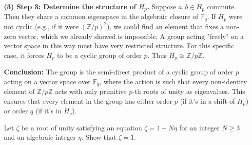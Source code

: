 \begin{solution}
\textbf{(3) Step 3: Determine the structure of $H_p$.}
Suppose $a, b \in H_p$ commute. Then they share a common eigenspace in the algebraic closure of $\mathbb{F}_q$.
If $H_p$ were not cyclic (e.g., if it were $(\mathbb{Z}/p)^2$), we could find an element that fixes a non-zero vector, which we already showed is impossible.
A group acting "freely" on a vector space in this way must have very restricted structure. For this specific case, it forces $H_p$ to be a cyclic group of order $p$.
Thus $H_p \cong \mathbb{Z}/p\mathbb{Z}$.

\textbf{Conclusion:}
The group is the semi-direct product of a cyclic group of order $p$ acting on a vector space over $\mathbb{F}_q$, where the action is such that every non-identity element of $\mathbb{Z}/p\mathbb{Z}$ acts with only primitive $p$-th roots of unity as eigenvalues. This ensures that every element in the group has either order $p$ (if it's in a shift of $H_p$) or order $q$ (if it's in $H_q$).
\end{solution}

\begin{exercise}
\label{algebra:2015:8}
Let $\zeta$ be a root of unity satisfying an equation $\zeta = 1 + N \eta$ for an integer $N \geq 3$ and an algebraic integer $\eta$. Show that $\zeta = 1$.
\end{exercise}

